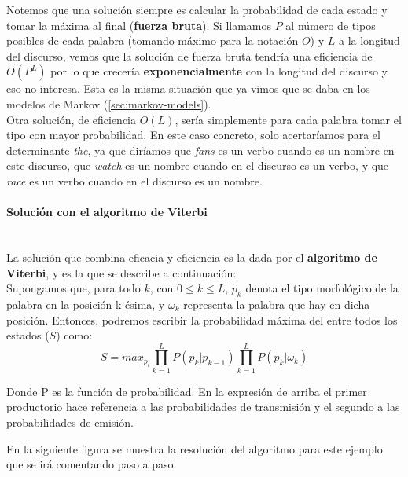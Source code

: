 \documentclass{article}
\newcommand{\myparagraph}[1]{\paragraph{#1}\mbox{}\\}
\begin{document}
Notemos que una solución siempre es calcular la probabilidad de cada estado y tomar la máxima al final (\textbf{fuerza bruta}). Si llamamos $P$ al número de tipos posibles de cada palabra (tomando máximo para la notación $O$) y $L$ a la longitud del discurso, vemos que la solución de fuerza bruta tendría una eficiencia de $O(P^L)$ por lo que crecería \textbf{exponencialmente} con la longitud del discurso y eso no interesa. Esta es la misma situación que ya vimos que se daba en los modelos de Markov (\ref{sec:markov-models}). \\

Otra solución, de eficiencia $O(L)$, sería simplemente para cada palabra tomar el tipo con mayor probabilidad. En este caso concreto, solo acertaríamos para el determinante \textit{the}, ya que diríamos que \textit{fans} es un verbo cuando es un nombre en este discurso, que \textit{watch} es un nombre cuando en el discurso es un verbo, y que \textit{race} es un verbo cuando en el discurso es un nombre.

\myparagraph{Solución con el algoritmo de Viterbi}

La solución que combina eficacia y eficiencia es la dada por el \textbf{algoritmo de Viterbi}, y es la que se describe a continuación: \\

Supongamos que, para todo $k$, con $0 \leq k \leq L$, $p_k$ denota el tipo morfológico de la palabra en la posición k-ésima, y $\omega_k$ representa la palabra que hay en dicha posición. Entonces, podremos escribir la probabilidad máxima del entre todos los estados ($S$) como:
\begin{equation}
    S = max_{p_i}\prod_{k=1}^LP(p_k|p_{k-1})\prod_{k=1}^LP(p_k|\omega_k)
    \label{eq:maxprobPOS-tagging}
\end{equation}

Donde P es la función de probabilidad. En la expresión de arriba el primer productorio hace referencia a las probabilidades de transmisión y el segundo a las probabilidades de emisión. 

En la siguiente figura se muestra la resolución del algoritmo para este ejemplo que se irá comentando paso a paso: \\
\end{document}
